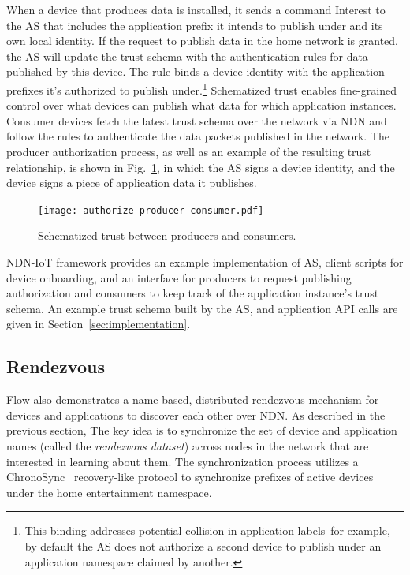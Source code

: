 When a device that produces data is installed, it sends a command Interest to the AS that includes the application prefix it intends to publish under and its own local identity.
If the request to publish data in the home network is granted, the AS will update the trust schema with the authentication rules for data published by this device. The rule binds a device identity with the application prefixes it's authorized to publish under.\footnote{This binding addresses potential collision in application labels--for example, by default the AS does not authorize a second device to publish under an application namespace claimed by another.}
Schematized trust enables fine-grained control over what devices can publish what data for which application instances. Consumer devices fetch the latest trust schema over the network via NDN and follow the rules to authenticate the data packets published in the network.
The producer authorization process, as well as an example of the resulting trust relationship, is shown in Fig.~\ref{fig:flow-app-authorization-trust-relationship}, in which the AS signs a device identity, and the device signs a piece of application data it publishes.

\begin{figure}[!t]
\centering
\texttt{[image: authorize-producer-consumer.pdf]}
\caption{Schematized trust between producers and consumers.}
\label{fig:flow-app-authorization-trust-relationship}
\end{figure}

NDN-IoT framework provides an example implementation of AS, client scripts for device onboarding, and an interface for producers to request publishing authorization and consumers to keep track of the application instance's trust schema.
An example trust schema built by the AS, and application API calls are given in Section~\ref{sec:implementation}.

\subsection{Rendezvous}
\label{sec:rendezvous}

Flow also demonstrates a name-based, distributed rendezvous mechanism for devices and applications to discover each other over NDN.
As described in the previous section, The key idea is to synchronize the set of device and application names (called the \textit{rendezvous dataset}) across nodes in the network that are interested in learning about them.
The synchronization process utilizes a ChronoSync~\cite{chronosync} recovery-like protocol to synchronize prefixes of active devices under the home entertainment  namespace.

